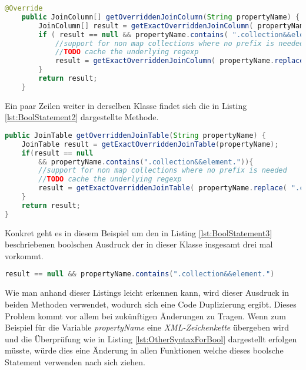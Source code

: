 \begin{lstlisting}[language=Java, caption=Komplexe boolsche Ausdrücke 1 Zeile 255 - 264, label=lst:BoolStatement1]
	@Override
	public JoinColumn[] getOverriddenJoinColumn(String propertyName) {
		JoinColumn[] result = getExactOverriddenJoinColumn( propertyName );
		if ( result == null && propertyName.contains( ".collection&&element." ) ) {
			//support for non map collections where no prefix is needed
			//TODO cache the underlying regexp
			result = getExactOverriddenJoinColumn( propertyName.replace( ".collection&&element.", "."  ) );
		}
		return result;
	}
\end{lstlisting}

\SuperPar Ein paar Zeilen weiter in derselben Klasse findet sich die in Listing \ref{lst:BoolStatement2} dargestellte Methode.

\begin{lstlisting}[language=Java, caption=Komplexe boolsche Ausdrücke 2 Zeile 305 - 313, label=lst:BoolStatement2]
public JoinTable getOverriddenJoinTable(String propertyName) {
	JoinTable result = getExactOverriddenJoinTable(propertyName);
	if(result == null 
		&& propertyName.contains(".collection&&element.")){
		//support for non map collections where no prefix is needed
		//TODO cache the underlying regexp
		result = getExactOverriddenJoinTable( propertyName.replace( ".collection&&element.", "."  ) );
	}
	return result;
}
\end{lstlisting}

\SuperPar Konkret geht es in diesem Beispiel um den in Listing \ref{lst:BoolStatement3} beschriebenen boolschen Ausdruck der in dieser Klasse insgesamt drei mal vorkommt.

\begin{lstlisting}[language=Java, caption=Boolscher Audruck, label=lst:BoolStatement3]
result == null && propertyName.contains(".collection&&element.")
\end{lstlisting}

\SuperPar Wie man anhand dieser Listings leicht erkennen kann, wird dieser Ausdruck in beiden Methoden verwendet, wodurch sich eine Code Duplizierung ergibt. Dieses Problem kommt vor allem bei zukünftigen Änderungen zu Tragen. Wenn zum Beispiel für die Variable \textit{propertyName} eine \textit{XML-Zeichenkette} übergeben wird und die Überprüfung wie in Listing \ref{lst:OtherSyntaxForBool} dargestellt erfolgen müsste, würde dies eine Änderung in allen Funktionen welche dieses boolsche Statement verwenden nach sich ziehen. 

